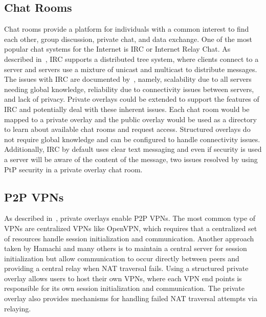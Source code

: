 \documentclass[conference]{IEEEtran}
\begin{document}
\subsection{Chat Rooms}
Chat rooms provide a platform for individuals with a common interest to find
each other, group discussion, private chat, and data exchange.  One of the most
popular chat systems for the Internet is IRC or Internet Relay Chat.  As
described in~\cite{irc}, IRC supports a distributed tree system, where clients
connect to a server and servers use a mixture of unicast and multicast to
distribute messages.  The issues with IRC are documented by~\cite{irc_arch},
namely, scalability due to all servers needing global knowledge, reliability due
to connectivity issues between servers, and lack of privacy.  Private overlays
could be extended to support the features of IRC and potentially deal with these
inherent issues.  Each chat room would be mapped to a private overlay and the
public overlay would be used as a directory to learn about available chat rooms
and request access.  Structured overlays do not require global knowledge and can
be configured to handle connectivity issues.  Additionally, IRC by default uses
clear text messaging and even if security is used a server will be aware of the
content of the message, two issues resolved by using PtP security in a private
overlay chat room.  

\subsection{P2P VPNs}
As described in~\cite{nsdi10}, private overlays enable P2P VPNs.  The most
common type of VPNs are centralized VPNs like OpenVPN, which requires that a
centralized set of resources handle session initialization and communication.
Another approach taken by Hamachi and many others is to maintain a central
server for session initialization but allow communication to occur directly
between peers and providing a central relay when NAT traversal fails.  Using
a structured private overlay allows users to host their own VPNs, where each
VPN end points is responsible for its own session initialization and
communication.  The private overlay also provides mechanisms for handling
failed NAT traversal attempts via relaying.
\end{document}
